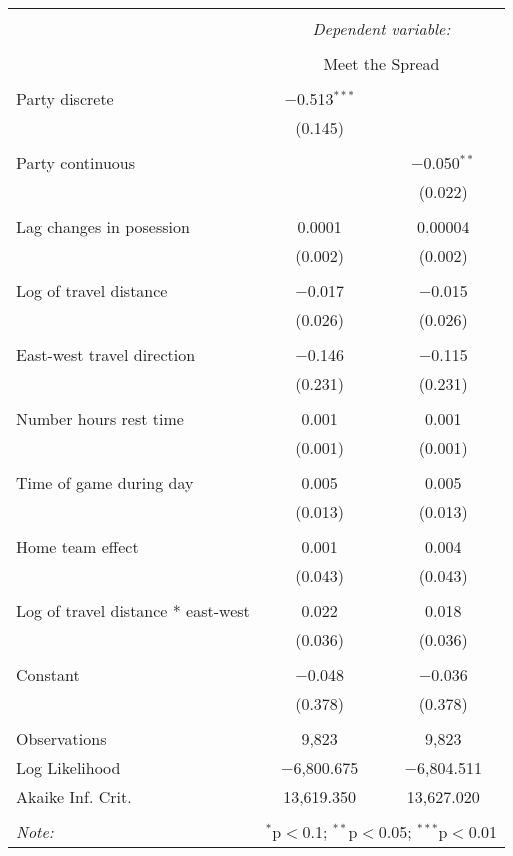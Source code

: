 \documentclass[letterpaper,12pt]{article}
\begin{document}
\begin{center}
\begin{tabular}{@{\extracolsep{5pt}}lcc}  \\[-1.8ex]\hline  \hline \\[-1.8ex]   & \multicolumn{2}{c}{\textit{Dependent variable:}} \\  \cline{2-3}  \\[-1.8ex] & \multicolumn{2}{c}{Meet the Spread} \\ \hline \\[-1.8ex]   Party discrete & $-$0.513$^{***}$ &  \\    & (0.145) &  \\    & & \\   Party continuous &  & $-$0.050$^{**}$ \\    &  & (0.022) \\    & & \\   Lag changes in posession & 0.0001 & 0.00004 \\    & (0.002) & (0.002) \\    & & \\   Log of travel distance & $-$0.017 & $-$0.015 \\    & (0.026) & (0.026) \\    & & \\   East-west travel direction & $-$0.146 & $-$0.115 \\    & (0.231) & (0.231) \\    & & \\   Number hours rest time & 0.001 & 0.001 \\    & (0.001) & (0.001) \\    & & \\   Time of game during day & 0.005 & 0.005 \\    & (0.013) & (0.013) \\    & & \\   Home team effect & 0.001 & 0.004 \\    & (0.043) & (0.043) \\    & & \\   Log of travel distance * east-west & 0.022 & 0.018 \\    & (0.036) & (0.036) \\    & & \\   Constant & $-$0.048 & $-$0.036 \\    & (0.378) & (0.378) \\ \hline \\[-1.8ex]  Observations & 9,823 & 9,823 \\  Log Likelihood & $-$6,800.675 & $-$6,804.511 \\  Akaike Inf. Crit. & 13,619.350 & 13,627.020 \\  \hline  \hline \\[-1.8ex]  \textit{Note:}  & \multicolumn{2}{r}{$^{*}$p$<$0.1; $^{**}$p$<$0.05; $^{***}$p$<$0.01}
\end{tabular} 
\end{center} 
\end{document}
